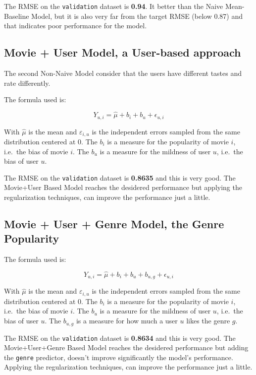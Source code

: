 \documentclass[]{article}
\begin{document}
The RMSE on the \texttt{validation} dataset is \textbf{0.94}. It better
than the Naive Mean-Baseline Model, but it is also very far from the
target RMSE (below 0.87) and that indicates poor performance for the
model.

\hypertarget{movie-user-model-a-user-based-approach}{%
\subsection{Movie + User Model, a User-based
approach}\label{movie-user-model-a-user-based-approach}}

The second Non-Naive Model consider that the users have different tastes
and rate differently.

The formula used is:

\[Y_{u,i} = \hat{\mu} + b_i + b_u + \epsilon_{u,i}\]

With \(\hat{\mu}\) is the mean and \(\varepsilon_{i,u}\) is the
independent errors sampled from the same distribution centered at 0. The
\(b_i\) is a measure for the popularity of movie \(i\), i.e.~the bias of
movie \(i\). The \(b_u\) is a measure for the mildness of user \(u\),
i.e.~the bias of user \(u\).

The RMSE on the \texttt{validation} dataset is \textbf{0.8635} and this
is very good. The Movie+User Based Model reaches the desidered
performance but applying the regularization techniques, can improve the
performance just a little.

\hypertarget{movie-user-genre-model-the-genre-popularity}{%
\subsection{Movie + User + Genre Model, the Genre
Popularity}\label{movie-user-genre-model-the-genre-popularity}}

The formula used is:

\[Y_{u,i} = \hat{\mu} + b_i + b_u + b_{u,g} + \epsilon_{u,i}\]

With \(\hat{\mu}\) is the mean and \(\varepsilon_{i,u}\) is the
independent errors sampled from the same distribution centered at 0. The
\(b_i\) is a measure for the popularity of movie \(i\), i.e.~the bias of
movie \(i\). The \(b_u\) is a measure for the mildness of user \(u\),
i.e.~the bias of user \(u\). The \(b_{u,g}\) is a measure for how much a
user \(u\) likes the genre \(g\).

The RMSE on the \texttt{validation} dataset is \textbf{0.8634} and this
is very good. The Movie+User+Genre Based Model reaches the desidered
performance but adding the \texttt{genre} predictor, doesn't improve
significantly the model's performance. Applying the regularization
techniques, can improve the performance just a little.
\end{document}
